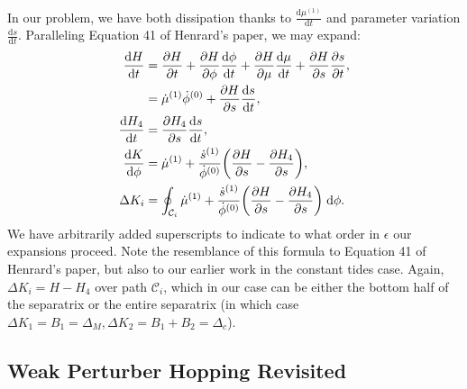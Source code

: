 \documentclass[11pt,
        usenames, %
        dvipsnames %
    ]{article}
\newcommand*{\rd}[2]{\frac{\mathrm{d}#1}{\mathrm{d}#2}}
\newcommand*{\pd}[2]{\frac{\partial#1}{\partial#2}}
\DeclarePairedDelimiter\p{\lparen}{\rparen}
\begin{document}
In our problem, we have both dissipation thanks to $\rd{\mu^{(1)}}{t}$ and
parameter variation $\rd{s}{t}$. Paralleling Equation 41 of Henrard's paper, we
may expand:
\begin{align}
    \rd{H}{t} &= \pd{H}{t} + \pd{H}{\phi}\rd{\phi}{t} + \pd{H}{\mu}\rd{\mu}{t}
            + \pd{H}{s}\pd{s}{t},\nonumber\\
        &= \dot{\mu}^{(1)} \dot{\phi}^{(0)} + \pd{H}{s}\rd{s}{t},\\
    \rd{H_4}{t} &= \pd{H_4}{s}\rd{s}{t},\\
    \rd{K}{\phi} &=
        \dot{\mu}^{(1)} + \frac{\dot{s}^{(1)}}{\dot{\phi}^{(0)}}
            \p*{\pd{H}{s} - \pd{H_4}{s}},\\
    \Delta K_i &= \oint_{\mathcal{C}_i}
        \dot{\mu}^{(1)} + \frac{\dot{s}^{(1)}}{\dot{\phi}^{(0)}}
            \p*{\pd{H}{s} - \pd{H_4}{s}}\;\mathrm{d}\phi.
\end{align}
We have arbitrarily added superscripts to indicate to what order in $\epsilon$
our expansions proceed. Note the resemblance of this formula to Equation 41 of
Henrard's paper, but also to our earlier work in the constant tides case. Again,
$\Delta K_i = H - H_4$ over path $\mathcal{C}_i$, which in our case can be either
the bottom half of the separatrix or the entire separatrix (in which case
$\Delta K_1 = B_1 = \Delta_M, \Delta K_2 = B_1 + B_2 = \Delta_c$).

\subsection{Weak Perturber Hopping Revisited}
\end{document}
